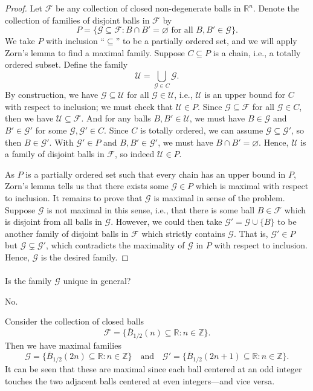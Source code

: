 \documentclass[12pt]{article}
\newlength{\myparskip}
\newenvironment{fullbox}{\begin{lrbox}{\savefullbox}\begin{minipage}{\dimexpr\textwidth-2\fboxsep\relax}\setlength{\parskip}{\myparskip}}{\end{minipage}\end{lrbox}\framebox[\textwidth]{\usebox{\savefullbox}}}
\newenvironment{pbox}[1][]{\begin{fullbox}\ifx#1\empty\else\paragraph{#1}\phantom{}\fi}{\end{fullbox}}
\theoremstyle{definition}
\newcommand{\isp}[1]{\quad\text{#1}\quad}
\newcommand{\Z}{\mathbb{Z}}
\newcommand{\R}{\mathbb{R}}
\renewcommand{\emptyset}{\varnothing}
\newcommand{\<}{\langle}
\renewcommand{\>}{\rangle}
\newcommand{\clo}{\overline}
\newcommand{\seq}{\subseteq}
\newcommand{\FF}{\mathcal{F}}
\newcommand{\GG}{\mathcal{G}}
\begin{document}
\begin{proof}
    Let $\FF$ be any collection of closed non-degenerate balls in $\R^n$.
    Denote the collection of families of disjoint balls in $\FF$ by
    \[
        P = \{\GG \seq \FF : B \cap B' = \emptyset \text{ for all } B, B' \in \GG\}.
    \]
    We take $P$ with inclusion ``$\seq$'' to be a partially ordered set, and we will apply Zorn's lemma to find a maximal family.
    Suppose $C \seq P$ is a chain, i.e., a totally ordered subset.
    Define the family
    \[
        \mathcal{U} = \bigcup_{\GG \in C} \GG.
    \]
    By construction, we have $\GG \seq \mathcal{U}$ for all $\GG \in \mathcal{U}$, i.e., $\mathcal{U}$ is an upper bound for $C$ with respect to inclusion; we must check that $\mathcal{U} \in P$.
    Since $\GG \seq \FF$ for all $\GG \in C$, then we have $\mathcal{U} \seq \FF$.
    And for any balls $B, B' \in \mathcal{U}$, we must have $B \in \GG$ and $B' \in \GG'$ for some $\GG, \GG' \in C$.
    Since $C$ is totally ordered, we can assume $\GG \seq \GG'$, so then $B \in \GG'$.
    With $\GG' \in P$ and $B, B' \in \GG'$, we must have $B \cap B' = \emptyset$.
    Hence, $\mathcal{U}$ is a family of disjoint balls in $\FF$, so indeed $\mathcal{U} \in P$.

    As $P$ is a partially ordered set such that every chain has an upper bound in $P$, Zorn's lemma tells us that there exists some $\GG \in P$ which is maximal with respect to inclusion.
    It remains to prove that $\GG$ is maximal in sense of the problem.
    Suppose $\GG$ is not maximal in this sense, i.e., that there is some ball $B \in \FF$ which is disjoint from all balls in $\GG$.
    However, we could then take $\GG' = \GG \cup \{B\}$ to be another family of disjoint balls in $\FF$ which strictly contains $\GG$.
    That is, $\GG' \in P$ but $\GG \subsetneq \GG'$, which contradicts the maximality of $\GG$ in $P$ with respect to inclusion.
    Hence, $\GG$ is the desired family.
\end{proof}

\begin{pbox}
    Is the family $\GG$ unique in general?
\end{pbox}

No.

Consider the collection of closed balls
\[
    \FF = \{\clo{B}_{1/2}(n) \seq \R : n \in \Z\}.
\]
Then we have maximal families
\[
    \GG = \{\clo{B}_{1/2}(2n) \seq \R : n \in \Z\}
    \isp{and}
    \GG' = \{\clo{B}_{1/2}(2n+1) \seq \R : n \in \Z\}.
\]
It can be seen that these are maximal since each ball centered at an odd integer touches the two adjacent balls centered at even integers---and vice versa.
\end{document}
